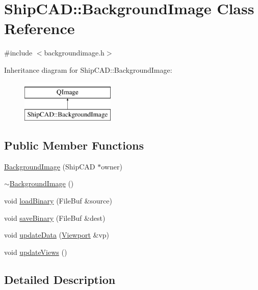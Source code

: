 \hypertarget{classShipCAD_1_1BackgroundImage}{\section{Ship\-C\-A\-D\-:\-:Background\-Image Class Reference}
\label{classShipCAD_1_1BackgroundImage}
}


{\ttfamily \#include $<$backgroundimage.\-h$>$}

Inheritance diagram for Ship\-C\-A\-D\-:\-:Background\-Image\-:\begin{figure}[H]
\begin{center}
\leavevmode
\includegraphics[height=2.000000cm]{classShipCAD_1_1BackgroundImage}
\end{center}
\end{figure}
\subsection*{Public Member Functions}
\begin{DoxyCompactItemize}
\item 
\hyperlink{classShipCAD_1_1BackgroundImage_ab37b2469c0bc2558b5eb27b42c5e30eb}{Background\-Image} (Ship\-C\-A\-D $\ast$owner)
\item 
\hyperlink{classShipCAD_1_1BackgroundImage_a77cbf94a033f736a6c7366cf1e956573}{$\sim$\-Background\-Image} ()
\item 
void \hyperlink{classShipCAD_1_1BackgroundImage_ae3b395941e8580f3921b0f9a40be71d8}{load\-Binary} (File\-Buf \&source)
\item 
void \hyperlink{classShipCAD_1_1BackgroundImage_ad5069ad93b2885d264620d36327956e9}{save\-Binary} (File\-Buf \&dest)
\item 
void \hyperlink{classShipCAD_1_1BackgroundImage_a856b8b55eafdb018792411f2edca81ef}{update\-Data} (\hyperlink{classShipCAD_1_1Viewport}{Viewport} \&vp)
\item 
void \hyperlink{classShipCAD_1_1BackgroundImage_ae64647d7f69166b1af28920953f6bfc4}{update\-Views} ()
\end{DoxyCompactItemize}


\subsection{Detailed Description}


